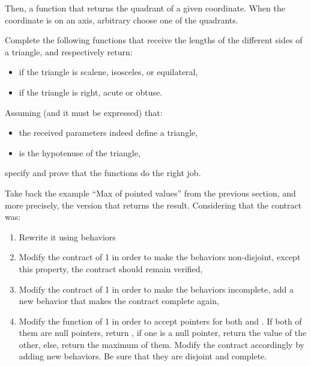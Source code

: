 

Then, a function that returns the quadrant of a given coordinate. When
the coordinate is on an axis, arbitrary choose one of the quadrants.






Complete the following functions that receive the lengths of the different
sides of a triangle, and respectively return:
\begin{itemize}
\item if the triangle is scalene, isosceles, or equilateral,
\item if the triangle is right, acute or obtuse.
\end{itemize}




Assuming (and it must be expressed) that:


\begin{itemize}
\item the received parameters indeed define a triangle,
\item {} is the hypotenuse of the triangle,
\end{itemize}


specify and prove that the functions do the right job.




Take back the example ``Max of pointed values'' from the previous section,
and more precisely, the version that returns the result. Considering that
the contract was:






\begin{enumerate}
\item Rewrite it using behaviors
\item Modify the contract of 1 in order to make the behaviors non-disjoint,
  except this property, the contract should remain verified,
\item Modify the contract of 1 in order to make the behaviors incomplete,
  add a new behavior that makes the contract complete again,
\item Modify the function of 1 in order to accept  pointers
  for both  and . If both of them are null pointers,
  return , if one is a null pointer, return the value of
  the other, else, return the maximum of them. Modify the contract accordingly
  by adding new behaviors. Be sure that they are disjoint and complete.
\end{enumerate}


